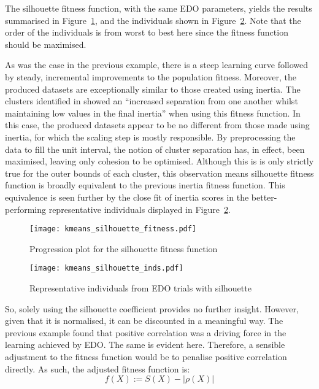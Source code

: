 The silhouette fitness function, with the same EDO parameters, yields the
results summarised in Figure~\ref{fig:kmeans_silhouette_fitness}, and the
individuals shown in Figure~\ref{fig:kmeans_silhouette_inds}. Note that the
order of the individuals is from worst to best here since the fitness function
should be maximised.

As was the case in the previous example, there is a steep learning curve
followed by steady, incremental improvements to the population fitness.
Moreover, the produced datasets are exceptionally similar to those created using
inertia. The clusters identified in \cite{Wilde2020:edo} showed an ``increased
separation from one another whilst maintaining low values in the final inertia''
when using this fitness function. In this case, the produced datasets appear to
be no different from those made using inertia, for which the scaling step is
mostly responsible. By preprocessing the data to fill the unit interval, the
notion of cluster separation has, in effect, been maximised, leaving only
cohesion to be optimised. Although this is is only strictly true for the outer
bounds of each cluster, this observation means silhouette fitness function is
broadly equivalent to the previous inertia fitness function. This equivalence is
seen further by the close fit of inertia scores in the better-performing
representative individuals displayed in Figure~\ref{fig:kmeans_silhouette_inds}.

\begin{figure}
    \centering
    \texttt{[image: kmeans\_silhouette\_fitness.pdf]}
    \caption{%
        Progression plot for the silhouette fitness function
    }\label{fig:kmeans_silhouette_fitness}
\end{figure}

\begin{figure}
    \centering
    \texttt{[image: kmeans\_silhouette\_inds.pdf]}
    \caption{%
        Representative individuals from EDO trials with silhouette
    }\label{fig:kmeans_silhouette_inds}
\end{figure}

So, solely using the silhouette coefficient provides no further insight.
However, given that it is normalised, it can be discounted in a meaningful way.
The previous example found that positive correlation was a driving force in the
learning achieved by EDO. The same is evident here. Therefore, a sensible
adjustment to the fitness function would be to penalise positive correlation
directly. As such, the adjusted fitness function is:
\begin{equation}\label{eq:discounted_silhouette}
f(X) := S(X) - \left|\rho(X)\right|
\end{equation}

